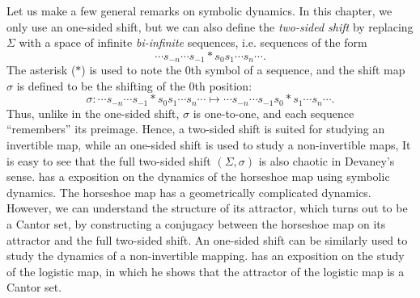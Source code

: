 \documentclass[10pt,twoside]{book}
\begin{document}
Let us make a few general remarks on symbolic dynamics.
In this chapter, we only use an one-sided shift, but we can also define the \textit{two-sided shift} by replacing $\Sigma$ with a space of infinite \textit{bi-infinite} sequences, i.e. sequences of the form 
\begin{equation*}
  \cdots s_{-n} \cdots s_{-1} * s_0 s_1 \cdots s_n \cdots.
\end{equation*}
The asterisk ($*$) is used to note the 0th symbol of a sequence, and the shift map $\sigma$ is defined to be the shifting of the 0th position:
\begin{equation*}
  \sigma: \cdots s_{-n} \cdots s_{-1} * s_0 s_1 \cdots s_n \cdots
  \mapsto
  \cdots s_{-n} \cdots s_{-1} s_0 * s_1 \cdots s_n \cdots.
\end{equation*}
Thus, unlike in the one-sided shift, $\sigma$ is one-to-one, and each sequence ``remembers'' its preimage.
Hence, a two-sided shift is suited for studying an invertible map, while an one-sided shift is used to study a non-invertible maps,
It is easy to see that the full two-sided shift $(\Sigma, \sigma)$ is also chaotic in Devaney's sense.
\citet{wiggins} has a exposition on the dynamics of the horseshoe map using symbolic dynamics.
The horseshoe map has a geometrically complicated dynamics.
However, we can understand the structure of its attractor, which turns out to be a Cantor set, by constructing a conjugacy between the horseshoe map on its attractor and the full two-sided shift.
An one-sided shift can be similarly used to study the dynamics of a non-invertible mapping.
\citet{sternberg} has an exposition on the study of the logistic map, in which he shows that the attractor of the logistic map is a Cantor set.
\end{document}
